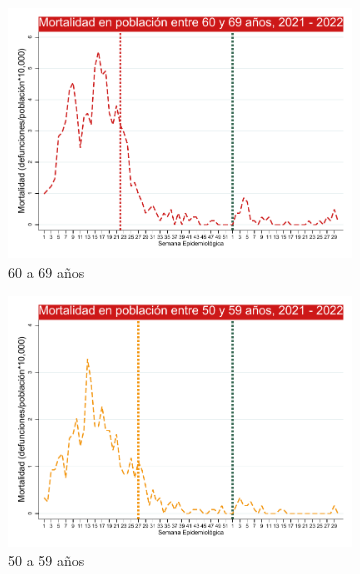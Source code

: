 \documentclass[xcolor=table]{beamer}
\begin{document}
\begin{frame}
\begin{figure}
	\begin{subfigure}[b]{0.3\textwidth}
		\centering
		\includegraphics[width=\textwidth]{../figuras/mortalidad_edad_60.pdf}
		\caption{60 a 69 años}
	\end{subfigure}
\vspace{10mm}
	\begin{subfigure}[b]{0.3\textwidth}
	\centering
	\includegraphics[width=\textwidth]{../figuras/mortalidad_edad_50.pdf}
	\caption{50 a 59 años}
\end{subfigure}
	\hfill
\begin{subfigure}[b]{0.3\textwidth}
	\centering

\end{subfigure}
\end{figure}
\end{frame}
\end{document}
